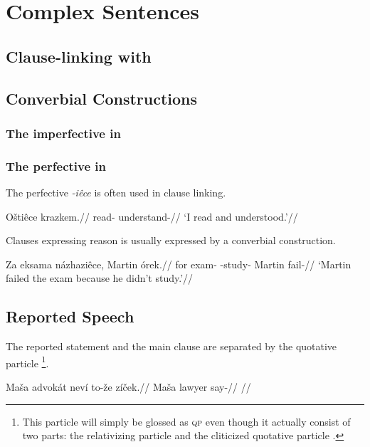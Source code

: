 \chapter{Complex Sentences}

\section{Clause-linking with }

\section{Converbial Constructions}\label{converbs-syntax}

\subsection{The imperfective in }



\subsection{The perfective in }

The perfective \textit{-iêce} is often used in clause linking.

\pex
\begingl
\gla O\v{s}tiêce krazkem.//
\glb read- understand-//
\glft `I read and understood.'//
\endgl
\xe

Clauses expressing reason is usually expressed by a converbial construction.

\pex
\begingl
\gla Za eksama názhaziêce, Martin órek.//
\glb for exam- -study- Martin fail-//
\glft `Martin failed the exam because he didn't study.'//
\endgl
\xe

\section{Reported Speech}\label{sec:reportedspeech}

The reported statement and the main clause are separated by the quotative particle \footnote{This particle will simply be glossed as {\scshape qp} even though it actually consist of two parts: the relativizing particle  and the cliticized quotative particle .}.

\pex
\begingl
\gla Ma\v{s}a advok\'at nev\'i to-\v{z}e z\'i\v{c}ek.//
\glb Ma\v{s}a lawyer   say-//
\glft {}//
\endgl
\xe

